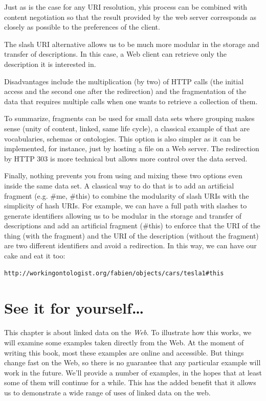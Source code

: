 Just as is the case for any URI resolution, yhis process can be combined with 
content negotiation so that
the result provided by the web server corresponds as closely as possible to the preferences
of the client.

The slash URI alternative allows us to be much more modular in
the storage and transfer of descriptions. In this case, a Web client can
retrieve only the description it is interested in.

Disadvantages include the multiplication (by two) of HTTP calls (the
initial access and the second one after the redirection) and the
fragmentation of the data that requires multiple calls when one wants to
retrieve a collection of them.

To summarize, fragments can be used for small data sets where grouping
makes sense (unity of content, linked, same life cycle), a classical
example of that are vocabularies, schemas or ontologies. This option is
also simpler as it can be implemented, for instance, just by
hosting a file on a Web server. The redirection by HTTP 303 is more
technical but allows more control over the data served.

Finally, nothing prevents you from using and mixing these two options
even inside the same data set. A classical way to do that is to add an
artificial fragment (e.g. \#me, \#this) to combine the modularity of 
slash URIs with the simplicity  of  hash URIs. For example, we can have a full
path with slashes to generate identifiers allowing us to be modular in
the storage and transfer of descriptions and add an artificial fragment
(\#this) to enforce that the URI of the thing (with the fragment) and
the URI of the description (without the fragment) are two different
identifiers and avoid a redirection. In this way, we can have our
cake and eat it too:

\begin{lstlisting}
http://workingontologist.org/fabien/objects/cars/tesla1#this
\end{lstlisting}

\hypertarget{see-it-for-yourself}{%
\section{See it for yourself\ldots{}}\label{see-it-for-yourself}}

This chapter is about linked data on the \emph{Web}.  To illustrate 
how this works, we will examine some examples taken directly from the Web. At
the moment of writing this book, most these examples are online and
accessible.   But things change fast on the Web, so there is no guarantee that 
any particular example will work in the future.   We'll provide a number of examples,
in the hopes that at least some of them will continue for a while.  This has the added benefit 
that it allows us to demonstrate a wide range of uses of linked data on the web. 

